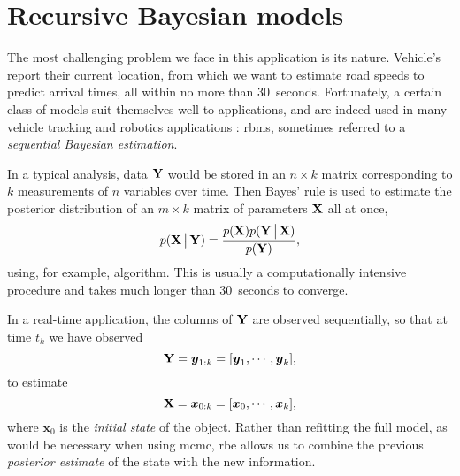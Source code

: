 \section{Recursive Bayesian models}
\label{sec:recursive-bayes}

The most challenging problem we face in this application is its \rt{} nature. Vehicle's report their current location, from which we want to estimate road speeds to predict arrival times, all within no more than 30~seconds. Fortunately, a certain class of models suit themselves well to \rt{} applications, and are indeed used in many vehicle tracking and robotics applications \citep{Anderson_1979,Gustafsson_2002,Mutambara_2000}: \glspl{rbm}, sometimes referred to a \emph{sequential Bayesian estimation}.


In a typical analysis, data $\mathbf{Y}$ would be stored in an $n\times k$ matrix corresponding to $k$ measurements of $n$ variables over time. Then Bayes' rule is used to estimate the posterior distribution of an $m\times k$ matrix of parameters $\mathbf{X}$ all at once,
\begin{equation}
\label{eq:bayes}
p(\mathbf{X}\,\big|\,{}\mathbf{Y}) =
\frac{
    p(\mathbf{X})
    p(\mathbf{Y}\,\big|\,{}\mathbf{X})
}{
    p(\mathbf{Y})
},
\end{equation}
using, for example,  algorithm. This is usually a computationally intensive procedure and takes much longer than 30~seconds to converge.


In a real-time application, the columns of $\mathbf{Y}$ are observed sequentially, so that at time $t_k$ we have observed
\begin{equation}
\label{eq:bayes_y_vector}
\mathbf{Y} = \boldsymbol{y}_{1:k} = [\boldsymbol{y}_1,\cdots,\boldsymbol{y}_k],
\end{equation}
to estimate
\begin{equation}
\label{eq:bayes_x_vector}
\mathbf{X} = \boldsymbol x_{0:k} = [\boldsymbol{x}_0,\cdots,\boldsymbol{x}_k],
\end{equation}
where $\boldsymbol{x}_0$ is the \emph{initial state} of the object. Rather than refitting the full model, as would be necessary when using \gls{mcmc}, \gls{rbe} allows us to combine the previous \emph{posterior estimate} of the state with the new information.

